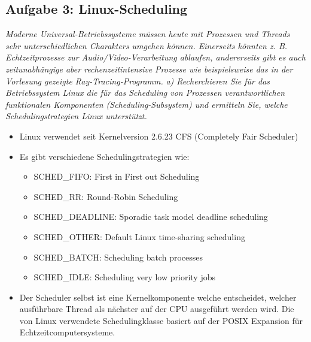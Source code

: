 \documentclass[a4paper]{article}
\begin{document}
\subsection{Aufgabe 3: Linux-Scheduling}
\textit{Moderne Universal-Betriebssysteme müssen heute mit Prozessen und Threads sehr unterschiedlichen Charakters umgehen können. Einerseits könnten z. B. Echtzeitprozesse zur Audio/Video-Verarbeitung ablaufen, andererseits gibt es auch zeitunabhängige aber rechenzeitintensive Prozesse wie beispielsweise das in der Vorlesung gezeigte Ray-Tracing-Programm.}
\vspace{10mm}
\textit{a) Recherchieren Sie für das Betriebssystem Linux die für das Scheduling von Prozessen verantwortlichen funktionalen Komponenten (Scheduling-Subsystem) und ermitteln Sie, welche Schedulingstrategien Linux unterstützt.}
\vspace{10mm}
\begin{itemize}
    \item Linux verwendet seit Kernelversion 2.6.23 CFS (Completely Fair Scheduler)
    \item Es gibt verschiedene Schedulingstrategien wie:
          \begin{itemize}
              \item SCHED\_FIFO: First in First out Scheduling
              \item SCHED\_RR: Round-Robin Scheduling
              \item SCHED\_DEADLINE: Sporadic task model deadline scheduling
              \item SCHED\_OTHER: Default Linux time-sharing scheduling
              \item SCHED\_BATCH: Scheduling batch processes
              \item SCHED\_IDLE: Scheduling very low priority jobs
          \end{itemize}
    \item Der Scheduler selbst ist eine Kernelkomponente welche entscheidet, welcher ausführbare Thread als nächster auf der CPU ausgeführt werden wird. Die von Linux verwendete Schedulingklasse basiert auf der POSIX Expansion für Echtzeitcomputersysteme.
\end{itemize}
\end{document}
